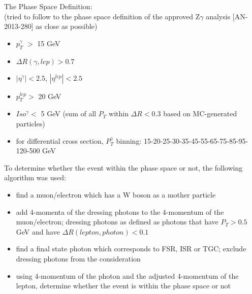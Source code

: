 The Phase Space Definition:\\
  (tried to follow to the phase space definition of the approved Z$\gamma$ analysis [AN-2013-280] as close as possible)
  \begin{itemize}
  \item $p_T^{\gamma}$ $>$ 15 GeV
  \item $\Delta{R}(\gamma,lep) > 0.7$
  \item $|\eta^{\gamma}|<2.5$, $|\eta^{lep}|<2.5$
  \item $p_T^{lep}>$ 20 GeV
  \item $Iso^{\gamma}<$ 5 GeV (sum of all $P_T$ within $\Delta{R}<$0.3 based on MC-generated particles)
  \item for differential cross section, $P_T^{\gamma}$ binning: 15-20-25-30-35-45-55-65-75-85-95-120-500 GeV
  \end{itemize}

To determine whether the event within the phase space or not, the following algorithm was used:
\begin{itemize}
   \item find a muon/electron which has a W boson as a mother particle
   \item add 4-momenta of the dressing photons to the 4-momentum of the muon/electron; dressing photons as defined as photons that have $P_T>0.5$ GeV and have $\Delta R(lepton,photon)<0.1$
   \item find a final state photon which corresponds to FSR, ISR or TGC; exclude dressing photons from the consideration
   \item using 4-momentum of the photon and the adjusted 4-momentum of the lepton, determine whether the event is within the phase space or not
\end{itemize}

